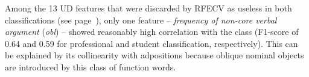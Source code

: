 Among the 13 UD features that were discarded by RFECV as useless in both classifications (see page~\pageref{pg:rfe_useless}), only one feature -- \textit{frequency of non-core verbal argument} (\textit{obl}) -- showed reasonably high correlation with the class (F1-score of 0.64 and 0.59 for professional and student classification, respectively). This can be explained by its collinearity with adpositions because oblique nominal objects are introduced by this class of function words. 




